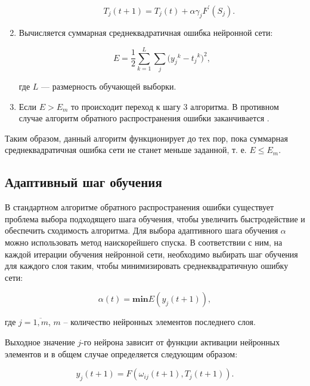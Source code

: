 \begin{enumerate}[wide, labelindent=10mm]
\begin{enumerate}[wide, labelindent=20mm]
        \begin{equation}
            T_j(t + 1) = T_j(t) + \alpha\gamma_jF^\prime(S_j).
        \end{equation}
    \end{enumerate}

    \item Вычисляется суммарная среднеквадратичная ошибка нейронной сети:

    \begin{equation}
        E = \frac{1}{2}\sum_{k = 1}^{L}{\sum_{j}{({y_j}^k} - {t_j}^k)^2},
    \end{equation}

    где $L$ — размерность обучающей выборки.

    \item Если $E>E_m$ то происходит переход к шагу 3 алгоритма. В противном случае алгоритм обратного распространения ошибки заканчивается \cite{Golovko_2001}.
\end{enumerate}

Таким образом, данный алгоритм функционирует до тех пор, пока суммарная среднеквадратичная ошибка сети не станет меньше заданной, т. е. $E\le E_m$.

\subsection{Адаптивный шаг обучения}

В стандартном алгоритме обратного распространения ошибки существует проблема выбора подходящего шага обучения, чтобы увеличить быстродействие и обеспечить сходимость алгоритма. Для выбора адаптивного шага обучения $\alpha$ можно использовать метод наискорейшего спуска. В соответствии с ним, на каждой итерации обучения нейронной сети, необходимо выбирать шаг обучения для каждого слоя таким, чтобы минимизировать среднеквадратичную ошибку сети:

\begin{equation}
    \alpha(t) = \mathbf{min}{E}(y_j(t + 1)),
\end{equation}

где $j = \overline{1, m}$, $m$ – количество нейронных элементов последнего слоя.

Выходное значение $j$-го нейрона зависит от функции активации нейронных элементов и в общем случае определяется следующим образом:

\begin{equation}
    y_j(t + 1) = F(\omega_{i j}(t + 1),T_j(t + 1)).
\end{equation}

